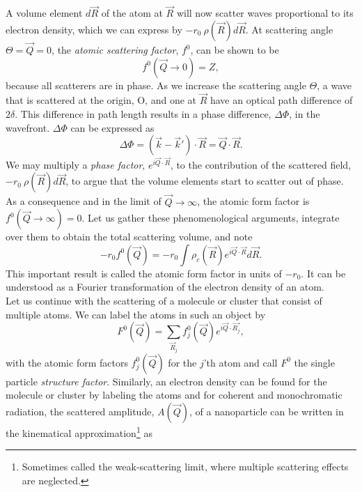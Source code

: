 %
A volume element $d\vec{R}$ of the atom at $\vec{R}$ will now scatter waves proportional to its electron density, which we can express by $-r_{0}\ \rho\left(\vec{R}\right)d\vec{R}$. At scattering angle $\Theta=\vec{Q}=0$, the \textit{atomic scattering factor}, $f^{0}$, can be shown to be
\begin{equation}
f^{0}\left(\vec{Q}\rightarrow 0\right)=Z,
\label{eq:transform-number-of-particles}
\end{equation}
because all scatterers are in phase. As we increase the scattering angle $\Theta$, a wave that is scattered at the origin, O, and one at $\vec{R}$ have an optical path difference of $2 \delta$. This difference in path length results in a phase difference, $\Delta \Phi$, in the wavefront. $\Delta \Phi$ can be expressed as 
\begin{equation}
\Delta \Phi = \left(\vec{k}-\vec{k}'\right)\cdot \vec{R} = \vec{Q}\cdot \vec{R}.
\label{eq:phase-difference}
\end{equation}
We may multiply a \textit{phase factor}, $e^{i \vec{Q}\cdot \vec{R}}$, to the contribution of the scattered field, $-r_{0}\ \rho\left(\vec{R}\right)d\vec{R}$, to argue that the volume elements start to scatter out of phase. As a consequence and in the limit of $\vec{Q}\rightarrow\infty$, the atomic form factor is $f^{0}\left(\vec{Q}\rightarrow\infty\right)=0$. Let us gather these phenomenological arguments, integrate over them to obtain the total scattering volume, and note
\begin{equation}
-r_{0} f^{0}\left(\vec{Q}\right)=-r_{0}\int\rho_{e}\left(\vec{R}\right)e^{i \vec{Q}\cdot \vec{R}}d\vec{R}.
\label{eq:scattering-integral}
\end{equation}
This important result is called the atomic form factor in units of $-r_{0}$. It can be understood as a Fourier transformation of the electron density of an atom.\\[1\baselineskip]
%
Let us continue with the scattering of a molecule or cluster that consist of multiple atoms. We can label the atoms in such an object by
\begin{equation}
F^{0}\left(\vec{Q}\right)=\sum_{\vec{R}_j}f_{j}^{0}\left(\vec{Q}\right)e^{i \vec{Q}\cdot \vec{R_{j}}},
\label{eq:scattering-factor-object}
\end{equation}
with the atomic form factors $f_{j}^{0}\left(\vec{Q}\right)$ for the $j$'th atom and call $F^{0}$ the single particle \textit{structure factor}. Similarly, an electron density can be found for the molecule or cluster by labeling the atoms \citep{Vartanyants-2001-JOP} and for coherent and monochromatic radiation, the scattered amplitude, $A(\vec{Q})$, of a nanoparticle can be written in the kinematical approximation\footnote{Sometimes called the weak-scattering limit, where multiple scattering effects are neglected.} as 
